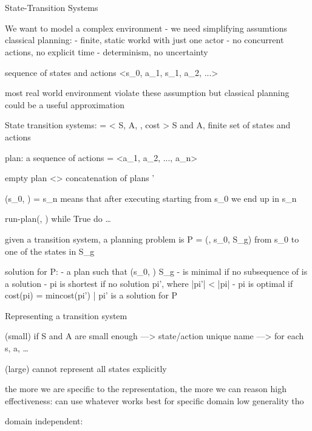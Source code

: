 \documentclass[11pt,a4paper]{article}
\theoremstyle{definition}
\theoremstyle{plain}
\theoremstyle{remark}
\begin{document}
\newpage
\tableofcontents
\newpage

\part{}

\section{}

State-Transition Systems

We want to model a complex environment - we need simplifying assumtions
classical planning:
- finite, static workd with just one actor
- no concurrent actions, no explicit time
- determinism, no uncertainty

sequence of states and actions <s_0, a_1, s_1, a_2, ...>

most real world environment violate these assumption but classical planning could be a useful approximation

State transition systems: \Epsilon = < S, A, \gamma, cost >
S and A, finite set of states and actions

plan: a sequence of actions \pi = <a_1, a_2, ..., a_n>

empty plan <>
concatenation of plans \pi \circ \pi' 

\gamma(s_0, \pi) = s_n means that after executing \pi starting from s_0 we end up in s_n 

run-plan(\Epsilon, \pi) 
while True do
    \dots


given a transition system, a planning problem is P = (\Epsilon, s_0, S_g) 
from s_0 to one of the states in S_g 

solution for P:
- a plan \pi such that \gamma(s_0, \pi) \in S_g 
- \pi is minimal if no subsequence of \pi is a solution
- pi is shortest if no solution pi', where |pi'| < |pi| 
- pi is optimal if cost(pi) = min{cost(pi') | pi' is a solution for P}


Representing a transition system \Epsilon 

(small)
if S and A are small enough ---> state/action unique name ---> for each s, a, \dots

(large)
cannot represent all states explicitly 


the more we are specific to the representation, the more we can reason 
high effectiveness: can use whatever works best for specific domain
low generality tho 

domain independent:
\end{document}
